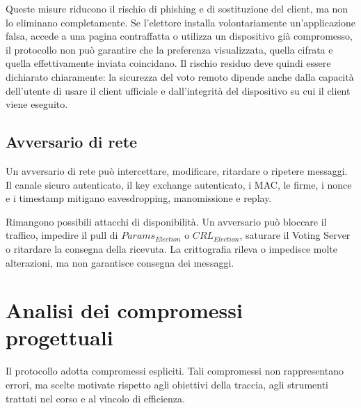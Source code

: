 \documentclass[a4paper,12pt]{article}
\begin{document}
Queste misure riducono il rischio di phishing e di sostituzione del client, ma non lo eliminano completamente.
Se l'elettore installa volontariamente un'applicazione falsa, accede a una pagina contraffatta o utilizza un dispositivo già compromesso, il protocollo non può garantire che la preferenza visualizzata, quella cifrata e quella effettivamente inviata coincidano.
Il rischio residuo deve quindi essere dichiarato chiaramente: la sicurezza del voto remoto dipende anche dalla capacità dell'utente di usare il client ufficiale e dall'integrità del dispositivo su cui il client viene eseguito.
\subsection{Avversario di rete}

Un avversario di rete può intercettare, modificare, ritardare o ripetere messaggi.
Il canale sicuro autenticato, il key exchange autenticato, i MAC, le firme, i nonce e i timestamp mitigano eavesdropping, manomissione e replay.

Rimangono possibili attacchi di disponibilità.
Un avversario può bloccare il traffico, impedire il pull di \(Params_{Election}\) o \(CRL_{Election}\), saturare il Voting Server o ritardare la consegna della ricevuta.
La crittografia rileva o impedisce molte alterazioni, ma non garantisce consegna dei messaggi.

\section{Analisi dei compromessi progettuali}

Il protocollo adotta compromessi espliciti.
Tali compromessi non rappresentano errori, ma scelte motivate rispetto agli obiettivi della traccia, agli strumenti trattati nel corso e al vincolo di efficienza.
\end{document}
